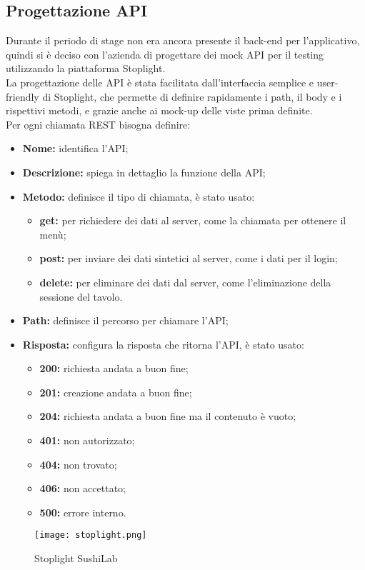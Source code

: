 \subsection{Progettazione API}
Durante il periodo di stage non era ancora presente il back-end per l'applicativo, quindi si è deciso con l'azienda di progettare dei mock API per il testing utilizzando la piattaforma Stoplight.\\
La progettazione delle API è stata facilitata dall'interfaccia semplice e user-friendly di Stoplight, che permette di definire rapidamente i path, il body e i rispettivi metodi, e grazie anche ai mock-up delle viste prima definite.\\
Per ogni chiamata REST bisogna definire:
\begin{itemize}
    \item \textbf{Nome:} identifica l'API;
    \item \textbf{Descrizione:} spiega in dettaglio la funzione della API;
    \item \textbf{Metodo:} definisce il tipo di chiamata, è stato usato:
    \begin{itemize}
        \item  \textbf{get:} per richiedere dei dati al server, come la chiamata per ottenere il menù;
        \item  \textbf{post:} per inviare dei dati sintetici al server, come i dati per il login;
        \item  \textbf{delete:} per eliminare dei dati dal server, come l'eliminazione della sessione del tavolo.
    \end{itemize}
    \item \textbf{Path:} definisce il percorso per chiamare l'API;
    \item \textbf{Risposta:} configura la risposta che ritorna l'API, è stato usato:
    \begin{itemize}
        \item  \textbf{200:} richiesta andata a buon fine;
        \item  \textbf{201:} creazione andata a buon fine;
        \item  \textbf{204:} richiesta andata a buon fine ma il contenuto è vuoto;
        \item  \textbf{401:} non autorizzato;
        \item  \textbf{404:} non trovato;
        \item  \textbf{406:} non accettato;
        \item  \textbf{500:} errore interno.
    \end{itemize}
\end{itemize}
\begin{figure}[H]
    \centering
    \texttt{[image: stoplight.png]}
    \caption{Stoplight SushiLab}
\end{figure}

